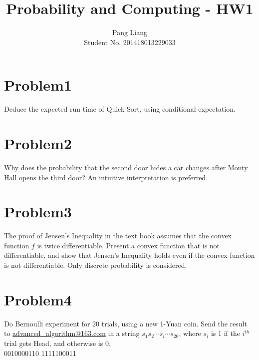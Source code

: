 \documentclass[12pt]{article}
\title{Probability and Computing - HW1}
\author{Pang Liang\\ Student No. 201418013229033}
\begin{document}
\maketitle

\section{Problem1}
Deduce the expected run time of Quick-Sort, using conditional expectation.\\



\section{Problem2}
Why does the probability that the second door hides a car changes after Monty Hall opens the third door? An intuitive interpretation is preferred.\\

\section{Problem3}
The proof of Jensen's Inequality in the text book assumes that the convex function $f$ is twice differentiable. Present a convex function that is not differentiable, and show that Jensen's Inequality holds even if the convex function is not differentiable. Only discrete probability is considered.\\

\section{Problem4}
Do Bernoulli experiment for 20 trials, using a new 1-Yuan coin. Send the result to \url{advanced\_algorithm@163.com} in a string $s_1s_2 \cdots s_i \cdots s_{20}$, where $s_i$ is 1 if the $i^{th}$ trial gets Head, and otherwise is 0.\\

0010000110 1111100011
\end{document}
